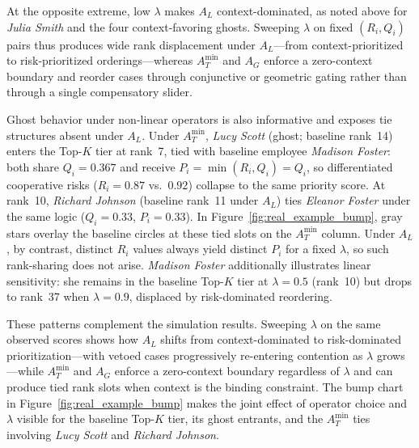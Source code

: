 \documentclass[mathematics,article,submit,moreauthors]{Definitions/mdpi}
\begin{document}
At the opposite extreme, low $\lambda$ makes $A_L$ context-dominated, as noted above for \textit{Julia Smith} and the four context-favoring ghosts. Sweeping $\lambda$ on fixed $(R_i, Q_i)$ pairs thus produces wide rank displacement under $A_L$---from context-prioritized to risk-prioritized orderings---whereas $A_T^{\min}$ and $A_G$ enforce a zero-context boundary and reorder cases through conjunctive or geometric gating rather than through a single compensatory slider.

Ghost behavior under non-linear operators is also informative and exposes tie structures absent under $A_L$. Under $A_T^{\min}$, \textit{Lucy Scott} (ghost; baseline rank~14) enters the Top-$K$ tier at rank~7, tied with baseline employee \textit{Madison Foster}: both share $Q_i = 0.367$ and receive $P_i = \min(R_i, Q_i) = Q_i$, so differentiated cooperative risks ($R_i = 0.87$ vs.\ $0.92$) collapse to the same priority score. At rank~10, \textit{Richard Johnson} (baseline rank~11 under $A_L$) ties \textit{Eleanor Foster} under the same logic ($Q_i = 0.33$, $P_i = 0.33$). In Figure~\ref{fig:real_example_bump}, gray stars overlay the baseline circles at these tied slots on the $A_T^{\min}$ column. Under $A_L$, by contrast, distinct $R_i$ values always yield distinct $P_i$ for a fixed $\lambda$, so such rank-sharing does not arise. \textit{Madison Foster} additionally illustrates linear sensitivity: she remains in the baseline Top-$K$ tier at $\lambda = 0.5$ (rank~10) but drops to rank~37 when $\lambda = 0.9$, displaced by risk-dominated reordering.

These patterns complement the simulation results. Sweeping $\lambda$ on the same observed scores shows how $A_L$ shifts from context-dominated to risk-dominated prioritization---with vetoed cases progressively re-entering contention as $\lambda$ grows---while $A_T^{\min}$ and $A_G$ enforce a zero-context boundary regardless of $\lambda$ and can produce tied rank slots when context is the binding constraint. The bump chart in Figure~\ref{fig:real_example_bump} makes the joint effect of operator choice and $\lambda$ visible for the baseline Top-$K$ tier, its ghost entrants, and the $A_T^{\min}$ ties involving \textit{Lucy Scott} and \textit{Richard Johnson}.
\end{document}
